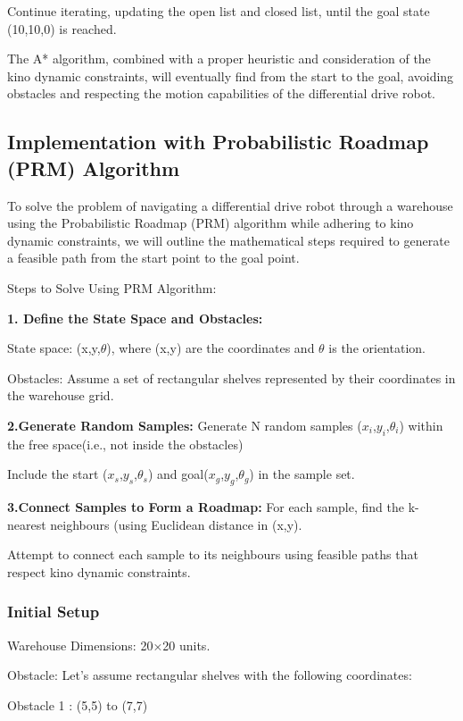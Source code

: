\documentclass[9pt,a4paper,twoside]{rho-class/rho}
\begin{document}
Continue iterating, updating the open list and closed list, until the goal state (10,10,0) is reached.

The A* algorithm, combined with a proper heuristic and consideration of the kino dynamic constraints, will eventually find from the start to the goal, avoiding obstacles and respecting the motion capabilities of the differential drive robot.

    \subsection{Implementation with Probabilistic Roadmap (PRM) Algorithm}
    To solve the problem of navigating a differential drive robot through a warehouse using the Probabilistic Roadmap (PRM) algorithm while adhering to kino dynamic constraints, we will outline the mathematical steps required to generate a feasible path from the start point to the goal point.
    
    Steps to Solve Using PRM Algorithm:
    
    \textbf{1. Define the State Space and Obstacles:}
    
    State space: (x,y,$\theta$), where (x,y) are the coordinates and $\theta$ is the orientation.
    
    Obstacles: Assume a set of rectangular shelves represented by their coordinates in the warehouse grid.
    
    \textbf{2.Generate Random Samples:}
    Generate N random samples ($x_i$,$y_i$,$\theta_i$) within the free space(i.e., not inside the obstacles)
    
    Include the start ($x_s$,$y_s$,$\theta_s$) and goal($x_g$,$y_g$,$\theta_g$) in the sample set.
    
    \textbf{3.Connect Samples to Form a Roadmap:}
    For each sample, find the k-nearest neighbours (using Euclidean distance in (x,y).
    
    Attempt to connect each sample to its neighbours using feasible paths that respect kino dynamic constraints.

    \subsubsection{Initial Setup}
Warehouse Dimensions: 20×20 units.

Obstacle: Let’s assume rectangular shelves with the following coordinates:

    Obstacle 1 : (5,5) to (7,7)
    
\end{document}

